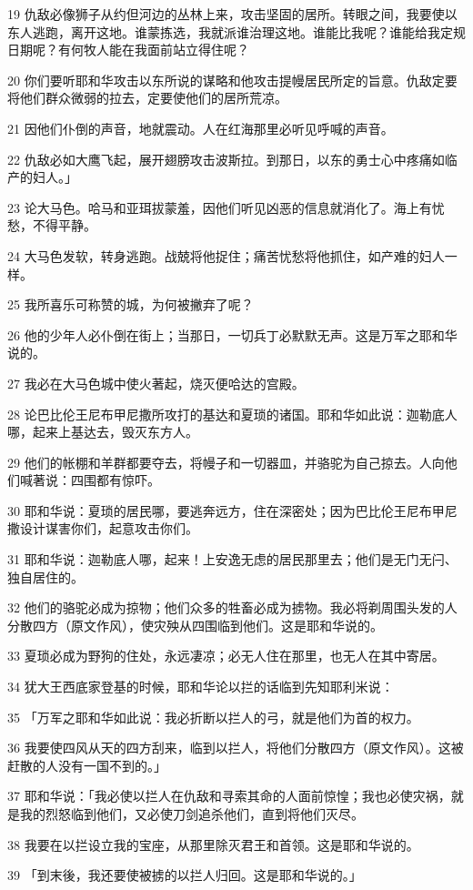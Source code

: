 \par 19 仇敌必像狮子从约但河边的丛林上来，攻击坚固的居所。转眼之间，我要使以东人逃跑，离开这地。谁蒙拣选，我就派谁治理这地。谁能比我呢？谁能给我定规日期呢？有何牧人能在我面前站立得住呢？
\par 20 你们要听耶和华攻击以东所说的谋略和他攻击提幔居民所定的旨意。仇敌定要将他们群众微弱的拉去，定要使他们的居所荒凉。
\par 21 因他们仆倒的声音，地就震动。人在红海那里必听见呼喊的声音。
\par 22 仇敌必如大鹰飞起，展开翅膀攻击波斯拉。到那日，以东的勇士心中疼痛如临产的妇人。」
\par 23 论大马色。哈马和亚珥拔蒙羞，因他们听见凶恶的信息就消化了。海上有忧愁，不得平静。
\par 24 大马色发软，转身逃跑。战兢将他捉住；痛苦忧愁将他抓住，如产难的妇人一样。
\par 25 我所喜乐可称赞的城，为何被撇弃了呢？
\par 26 他的少年人必仆倒在街上；当那日，一切兵丁必默默无声。这是万军之耶和华说的。
\par 27 我必在大马色城中使火著起，烧灭便哈达的宫殿。
\par 28 论巴比伦王尼布甲尼撒所攻打的基达和夏琐的诸国。耶和华如此说：迦勒底人哪，起来上基达去，毁灭东方人。
\par 29 他们的帐棚和羊群都要夺去，将幔子和一切器皿，并骆驼为自己掠去。人向他们喊著说：四围都有惊吓。
\par 30 耶和华说：夏琐的居民哪，要逃奔远方，住在深密处；因为巴比伦王尼布甲尼撒设计谋害你们，起意攻击你们。
\par 31 耶和华说：迦勒底人哪，起来！上安逸无虑的居民那里去；他们是无门无闩、独自居住的。
\par 32 他们的骆驼必成为掠物；他们众多的牲畜必成为掳物。我必将剃周围头发的人分散四方（原文作风），使灾殃从四围临到他们。这是耶和华说的。
\par 33 夏琐必成为野狗的住处，永远凄凉；必无人住在那里，也无人在其中寄居。
\par 34 犹大王西底家登基的时候，耶和华论以拦的话临到先知耶利米说：
\par 35 「万军之耶和华如此说：我必折断以拦人的弓，就是他们为首的权力。
\par 36 我要使四风从天的四方刮来，临到以拦人，将他们分散四方（原文作风）。这被赶散的人没有一国不到的。」
\par 37 耶和华说：「我必使以拦人在仇敌和寻索其命的人面前惊惶；我也必使灾祸，就是我的烈怒临到他们，又必使刀剑追杀他们，直到将他们灭尽。
\par 38 我要在以拦设立我的宝座，从那里除灭君王和首领。这是耶和华说的。
\par 39 「到末後，我还要使被掳的以拦人归回。这是耶和华说的。」

